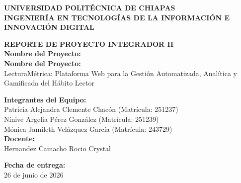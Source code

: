 \documentclass[12pt, atypical, journal]{article}
\begin{document}
\begin{titlepage}
   \begin{center}
       \vspace*{1cm}
      
       {\Large\bfseries UNIVERSIDAD POLITÉCNICA DE CHIAPAS} \\[0.5cm]
       {\large\bfseries INGENIERÍA EN TECNOLOGÍAS DE LA INFORMACIÓN E INNOVACIÓN DIGITAL} \\[1.5cm]
      
       \vfill
      
       {\Large\bfseries REPORTE DE PROYECTO INTEGRADOR II} \\[1cm]
      
       \textbf{Nombre del Proyecto:} \\
       \textbf{Nombre del Proyecto:} \\
       {\large LecturaMétrica: Plataforma Web para la Gestión Automatizada, Analítica y Gamificada del Hábito Lector} \\[1.5cm]
      
       \vfill
      
       \textbf{Integrantes del Equipo:} \\[0.3cm]
       {\large Patricia Alejandra Clemente Chacón (Matrícula: 251237)} \\
       {\large Nínive Argelia Pérez González (Matrícula: 251239)} \\
       {\large Mónica Jamileth Velázquez García (Matrícula: 243729)} \\[1.5cm]
      
       \textbf{Docente:} \\
       {\large Hernandez Camacho Rocio Crystal} \\[1.5cm]
      
       \vfill
      
       \textbf{Fecha de entrega:} \\
       {\large 26 de junio de 2026}
      
       \vspace*{1cm}
   \end{center}
\end{titlepage}

\newpage

\tableofcontents
\newpage
\end{document}
